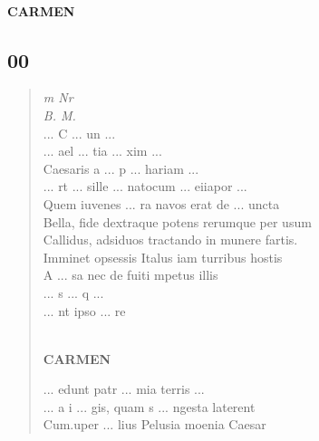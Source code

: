\documentclass[11pt, a4paper]{report}
\begin{document}

            
        ﻿\pagebreak 
    
            \begin{center} \textbf{CARMEN} \end{center}
            \subsection*{00}
      \begin{verse}
      \textit{m Nr} \\ \textit{B. M.} \\ 
                     \lbrack ... \rbrack  C  \lbrack ... \rbrack  un  \lbrack ... \rbrack 
                 \\ 
                     \lbrack ... \rbrack  ael  \lbrack ... \rbrack  tia  \lbrack ... \rbrack  xim  \lbrack ... \rbrack 
                 \\ Caesaris a  \lbrack ... \rbrack  p  \lbrack ... \rbrack  hariam  \lbrack ... \rbrack 
                 \\  \lbrack ... \rbrack rt  \lbrack ... \rbrack  sille  \lbrack ... \rbrack  natocum
                         \lbrack ... \rbrack  eiiapor  \lbrack ... \rbrack 
                 \\ Quem iuvenes  \lbrack ... \rbrack  ra navos erat de  \lbrack ... \rbrack 
                    uncta \\ Bella, fide dextraque potens rerumque per usum \\ Callidus, adsiduos tractando in munere fartis. \\ Imminet opsessis Italus iam turribus hostis \\ A  \lbrack ... \rbrack  sa nec de fuiti mpetus illis \\ 
                     \lbrack ... \rbrack  s  \lbrack ... \rbrack  q  \lbrack ... \rbrack 
                 \\ 
                     \lbrack ... \rbrack  nt ipso  \lbrack ... \rbrack  re \\ 
        ﻿\pagebreak 
    \begin{center} \textbf{CARMEN} \end{center}
                     \lbrack ... \rbrack  edunt patr  \lbrack ... \rbrack  mia terris  \lbrack ... \rbrack 
                 \\ 
                     \lbrack ... \rbrack  a i  \lbrack ... \rbrack  gis, quam s  \lbrack ... \rbrack 
                    ngesta laterent \\ Cum.uper  \lbrack ... \rbrack  lius Pelusia moenia Caesar \\ 

\end{verse}
\end{document}

